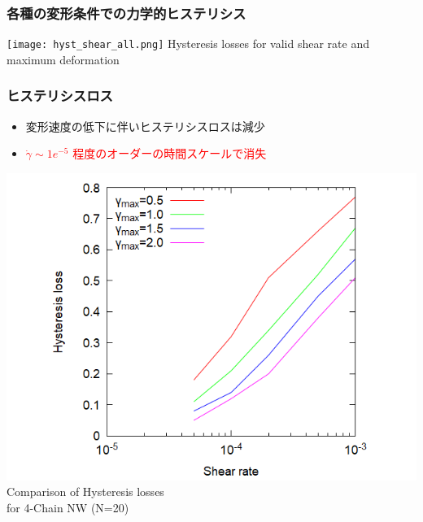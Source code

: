 \documentclass[12pt, dvipdfmx]{beamer}
\begin{document}
\begin{frame}
	\frametitle{各種の変形条件での力学的ヒステリシス}
		\centering
			\texttt{[image: hyst\_shear\_all.png]}
			Hysteresis losses for valid shear rate and maximum deformation
\end{frame}

\begin{frame}
	\frametitle{ヒステリシスロス}
	\begin{itemize}
		\item 変形速度の低下に伴いヒステリシスロスは減少
		\item \textcolor{red}{$\dot{\gamma} \sim 1e^{-5}$ 程度のオーダーの時間スケールで消失}
	\end{itemize}
			\centering
				\includegraphics[width=.6\textwidth]{hyst_shear.png}\\
					Comparison of Hysteresis losses \\for 4-Chain NW (N=20)
\end{frame}
\end{document}
